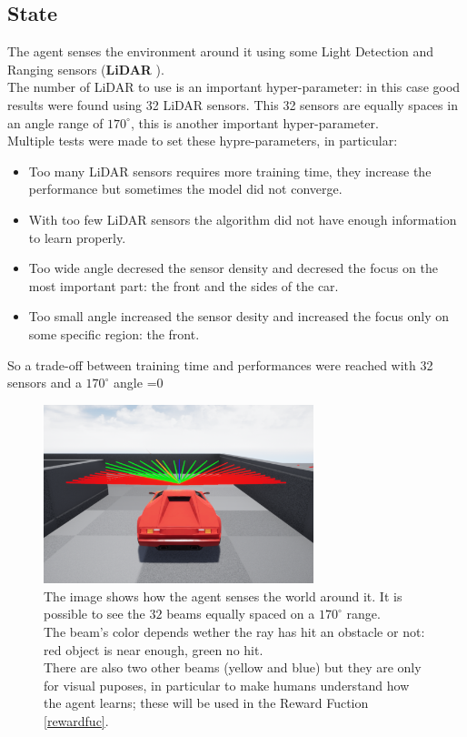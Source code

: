 \documentclass[14pt]{extarticle}
\def\sp{\vspace{5pt}}
\newcounter{debug}
\begin{document}
\begin{flushleft}
	\subsection{State}
	\sp
	The agent senses the environment around it using some Light Detection and Ranging sensors (\textbf{LiDAR} \cite{LiDAR}). \\
	The number of LiDAR to use is an important hyper-parameter: in this case good results were found using 32 LiDAR sensors. This 32 sensors are equally spaces in an angle range of $170^{\circ}$, this is another important hyper-parameter. \\
	Multiple tests were made to set these hypre-parameters, in particular:
	\begin{itemize}
	\item Too many LiDAR sensors requires more training time, they increase the performance but sometimes the model did not converge.
	\item With too few LiDAR sensors the algorithm did not have enough information to learn properly.
	\item Too wide angle decresed the sensor density and decresed the focus on the most important part: the front and the sides of the car.
	\item Too small angle increased the sensor desity and increased the focus only on some specific region: the front.
	\end{itemize}
	So a trade-off between training time and performances were reached with 32 sensors and a $170^{\circ}$ angle
	\ifnum\value{debug}=0 {
	\begin{figure}[H] \label{carState}
    		\centering\includegraphics[width=0.7\textwidth]{./Image/State/carSensors.png}
		\vspace{5mm}
		\caption{The image shows how the agent senses the world around it. It is possible to see the $32$ beams equally spaced on a $170^{\circ}$ range. \\
		The beam's color depends wether the ray has hit an obstacle or not: red object is near enough, green no hit. \\
		There are also two other beams (yellow and blue) but they are only for visual puposes, in particular to make humans understand how the agent learns; these will be used in the Reward Fuction \ref{rewardfuc}.}
	\end{figure}
	}\fi
	

\end{flushleft}
\end{document}

